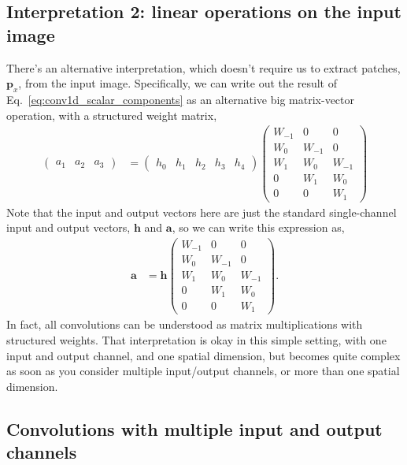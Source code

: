 \documentclass{article}
\renewcommand{\a}{\mathbf{a}}
\newcommand{\h}{\mathbf{h}}
\newcommand{\p}{\mathbf{p}}
\begin{document}
\subsection{Interpretation 2: linear operations on the input image}
There's an alternative interpretation, which doesn't require us to extract patches, $\p_x$, from the input image.
Specifically, we can write out the result of Eq.~\eqref{eq:conv1d_scalar_components} as an alternative big matrix-vector operation, with a structured weight matrix,
\begin{align}
  \begin{pmatrix}
    a_1 & a_2 & a_3
  \end{pmatrix}
  &= 
  \begin{pmatrix}
    h_0 & h_1 & h_2 & h_3 & h_4
  \end{pmatrix}
  \begin{pmatrix}
    W_{-1} &   0    &   0    \\
    W_{ 0} & W_{-1} &   0    \\
    W_{ 1} & W_{ 0} & W_{-1} \\
      0    & W_{ 1} & W_{ 0} \\
      0    &   0    & W_{ 1}
  \end{pmatrix}
\end{align}
Note that the input and output vectors here are just the standard single-channel input and output vectors, $\h$ and $\a$, so we can write this expression as,
\begin{align}
  \a &= \h 
  \begin{pmatrix}
    W_{-1} &   0    &   0    \\
    W_{ 0} & W_{-1} &   0    \\
    W_{ 1} & W_{ 0} & W_{-1} \\
      0    & W_{ 1} & W_{ 0} \\
      0    &   0    & W_{ 1}
  \end{pmatrix}.
\end{align}
In fact, all convolutions can be understood as matrix multiplications with structured weights.
That interpretation is okay in this simple setting, with one input and output channel, and one spatial dimension, but becomes quite complex as soon as you consider multiple input/output channels, or more than one spatial dimension.

\FloatBarrier
\subsection{Convolutions with multiple input and output channels}
\end{document}
